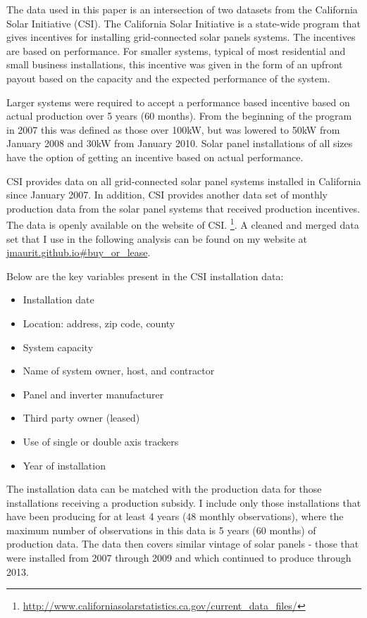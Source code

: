 \documentclass[12pt]{article}
\begin{document}
The data used in this paper is an intersection of two datasets from the California Solar Initiative (CSI). The California Solar Initiative is a state-wide program that gives incentives for installing grid-connected solar panels systems. The incentives are based on performance. For smaller systems, typical of most residential and small business installations, this incentive was given in the form of an upfront payout based on the capacity and the expected performance of the system. 

Larger systems were required to accept a performance based incentive based on actual production over 5 years (60 months). From the beginning of the program in 2007 this was defined as those over 100kW, but was lowered to 50kW from January 2008 and 30kW from January 2010. Solar panel installations of all sizes have the option of getting an incentive based on actual performance.

CSI provides data on all grid-connected solar panel systems installed in California since January 2007. In addition, CSI provides another data set of monthly production data from the solar panel systems that received production incentives. The data is openly available on the website of CSI. \footnote{\url{http://www.californiasolarstatistics.ca.gov/current_data_files/}}. A cleaned and merged data set that I use in the following analysis can be found on my website at \url{jmaurit.github.io#buy_or_lease}.

Below are the key variables present in the CSI installation data:

\begin{itemize}
\item Installation date
\item Location: address, zip code, county
\item System capacity
\item Name of system owner, host, and contractor
\item Panel and inverter manufacturer 
\item Third party owner (leased)
\item Use of single or double axis trackers
\item Year of installation
\end{itemize}

The installation data can be matched with the production data for those installations receiving a production subsidy. I include only those installations that have been producing for at least 4 years (48 monthly observations), where the maximum number of observations in this data is 5 years (60 months) of production data. The data then covers similar vintage of solar panels - those that were installed from 2007 through 2009 and which continued to produce through 2013. 
\end{document}

